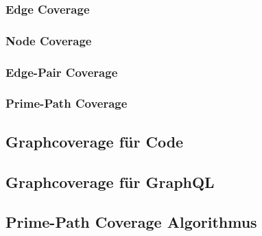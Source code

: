 \subsubsection{Edge Coverage}

\subsubsection{Node Coverage}

\subsubsection{Edge-Pair Coverage}

\subsubsection{Prime-Path Coverage}

\subsection{Graphcoverage für Code}

\subsection{Graphcoverage für GraphQL}

\subsection{Prime-Path Coverage Algorithmus}


